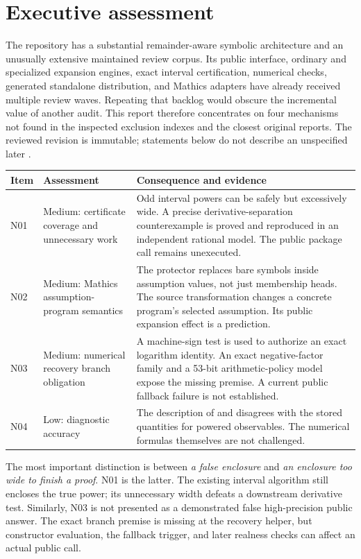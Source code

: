 \documentclass[11pt,letterpaper]{article}
\newcommand{\code}[1]{\texttt{\detokenize{#1}}}
\begin{document}
{\small\setlength{\parskip}{0pt}\tableofcontents}
\clearpage

\section{Executive assessment}

The repository has a substantial remainder-aware symbolic architecture and an unusually extensive maintained review corpus. Its public interface, ordinary and specialized expansion engines, exact interval certification, numerical checks, generated standalone distribution, and Mathics adapters have already received multiple review waves. Repeating that backlog would obscure the incremental value of another audit. This report therefore concentrates on four mechanisms not found in the inspected exclusion indexes and the closest original reports. The reviewed revision is immutable; statements below do not describe an unspecified later \code{main}.\cite{repo,review-index,status,wave3,wave4,wave5}

\begin{tabularx}{\textwidth}{@{}P{0.45in}P{1.6in}Y@{}}
\toprule
Item & Assessment & Consequence and evidence\\\midrule
N01 & Medium: certificate coverage and unnecessary work & Odd interval powers can be safely but excessively wide. A precise derivative-separation counterexample is proved and reproduced in an independent rational model. The public package call remains unexecuted.\\[6pt]
N02 & Medium: Mathics assumption-program semantics & The protector replaces bare \code{Element} symbols inside assumption values, not just membership heads. The source transformation changes a concrete program's selected assumption. Its public expansion effect is a prediction.\\[6pt]
N03 & Medium: numerical recovery branch obligation & A machine-sign test is used to authorize an exact logarithm identity. An exact negative-factor family and a 53-bit arithmetic-policy model expose the missing premise. A current public fallback failure is not established.\\[6pt]
N04 & Low: diagnostic accuracy & The description of \code{LocalRoot} and \code{LocalApproximation} disagrees with the stored quantities for powered observables. The numerical formulas themselves are not challenged.\\
\bottomrule
\end{tabularx}

The most important distinction is between \emph{a false enclosure} and \emph{an enclosure too wide to finish a proof}. N01 is the latter. The existing interval algorithm still encloses the true power; its unnecessary width defeats a downstream derivative test. Similarly, N03 is not presented as a demonstrated false high-precision public answer. The exact branch premise is missing at the recovery helper, but constructor evaluation, the fallback trigger, and later realness checks can affect an actual public call.
\end{document}

